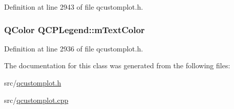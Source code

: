 Definition at line 2943 of file qcustomplot.\-h.

\hypertarget{class_q_c_p_legend_a478b2d809a7390e9ff8f8bb70d6bd9fe}{
\subsubsection[{m\-Text\-Color}]{\setlength{\rightskip}{0pt plus 5cm}Q\-Color Q\-C\-P\-Legend\-::m\-Text\-Color\hspace{0.3cm}{\ttfamily [protected]}}}\label{class_q_c_p_legend_a478b2d809a7390e9ff8f8bb70d6bd9fe}


Definition at line 2936 of file qcustomplot.\-h.



The documentation for this class was generated from the following files\-:\begin{DoxyCompactItemize}
\item 
src/\hyperlink{qcustomplot_8h}{qcustomplot.\-h}\item 
src/\hyperlink{qcustomplot_8cpp}{qcustomplot.\-cpp}\end{DoxyCompactItemize}
